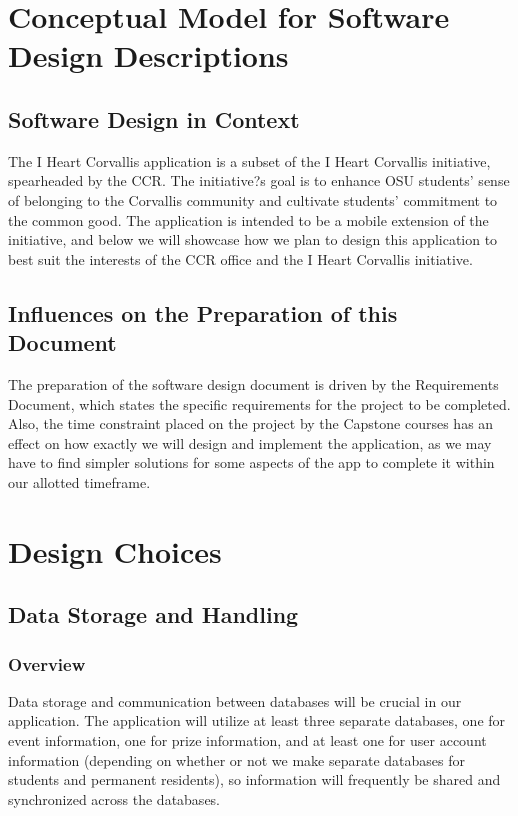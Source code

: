 \documentclass[draftclsnofoot, onecolumn, 10pt, compsoc]{IEEEtran}
\begin{document}
	\section{Conceptual Model for Software Design Descriptions}
		\subsection{Software Design in Context}
			The I Heart Corvallis application is a subset of the I Heart Corvallis initiative, spearheaded by the CCR. The initiative?s goal is to enhance OSU students' sense of belonging to the Corvallis community and cultivate students' commitment to the common good. The application is intended to be a mobile extension of the initiative, and below we will showcase how we plan to design this application to best suit the interests of the CCR office and the I Heart Corvallis initiative.

		\subsection{Influences on the Preparation of this Document}
			The preparation of the software design document is driven by the Requirements Document, which states the specific requirements for the project to be completed. Also, the time constraint placed on the project by the Capstone courses has an effect on how exactly we will design and implement the application, as we may have to find simpler solutions for some aspects of the app to complete it within our allotted timeframe.
	
	\section{Design Choices}
		\subsection{Data Storage and Handling}
			\subsubsection{Overview}
				Data storage and communication between databases will be crucial in our application. The application will utilize at least three separate databases, one for event information, one for prize information, and at least one for user account information (depending on whether or not we make separate databases for students and permanent residents), so information will frequently be shared and synchronized across the databases.
\end{document}

